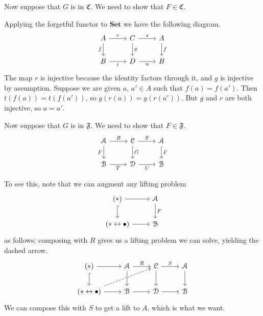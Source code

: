 \documentclass[main.tex]{subfiles}
\begin{document}
Now suppose that $G$ is in $\mathfrak{C}$. We need to show that $F \in \mathfrak{C}$.

Applying the forgetful functor to $\mathbf{Set}$ we have the following diagram.
\begin{equation*}
  \begin{tikzcd}
    A
    \arrow[r, "r"]
    \arrow[d, swap, "f"]
    & C
    \arrow[d, "g"]
    \arrow[r, "s"]
    & A
    \arrow[d, "f"]
    \\
    B
    \arrow[r, swap, "t"]
    & D
    \arrow[r, swap, "u"]
    & B
  \end{tikzcd}
\end{equation*}
The map $r$ is injective because the identity factors through it, and $g$ is injective by assumption. Suppose we are given $a$, $a' \in A$ such that $f(a) = f(a')$. Then $t(f(a)) = t(f(a'))$, so $g(r(a)) = g(r(a'))$. But $g$ and $r$ are both injective, so $a = a'$.

Now suppose that $G$ is in $\mathfrak{F}$. We need to show that $F \in \mathfrak{F}$.
\begin{equation*}
  \begin{tikzcd}
    \mathcal{A}
    \arrow[d, swap, "F"]
    \arrow[r, "R"]
    & \mathcal{C}
    \arrow[d, "G"]
    \arrow[r, "S"]
    & \mathcal{A}
    \arrow[d, "F"]
    \\
    \mathcal{B}
    \arrow[r, swap, "T"]
    & \mathcal{D}
    \arrow[r, swap, "U"]
    & \mathcal{B}
  \end{tikzcd}
\end{equation*}

To see this, note that we can augment any lifting problem
\begin{equation*}
  \begin{tikzcd}
    (*)
    \arrow[r]
    \arrow[d, hookrightarrow]
    & \mathcal{A}
    \arrow[d, "F"]
    \\
    (* \leftrightarrow \bullet)
    \arrow[r]
    & \mathcal{B}
  \end{tikzcd}
\end{equation*}
as follows; composing with $R$ gives us a lifting problem we can solve, yielding the dashed arrow.
\begin{equation*}
  \begin{tikzcd}
    (*)
    \arrow[r]
    \arrow[d, hookrightarrow]
    & \mathcal{A}
    \arrow[d]
    \arrow[r, "R"]
    & \mathcal{C}
    \arrow[r, "S"]
    \arrow[d]
    & \mathcal{A}
    \arrow[d]
    \\
    (* \leftrightarrow \bullet)
    \arrow[r]
    \arrow[urr, dashed]
    & \mathcal{B}
    \arrow[r]
    & \mathcal{D}
    \arrow[r]
    & \mathcal{B}
  \end{tikzcd}
\end{equation*}
We can compose this with $S$ to get a lift to $A$, which is what we want.
\end{document}
